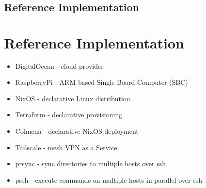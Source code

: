 \hypertarget{section}{%
\chapter{}\label{section}}

\section{Reference Implementation}

\hypertarget{reference-implementation}{%
\chapter{Reference Implementation}\label{reference-implementation}}

\begin{itemize}
\tightlist
\item
  DigitalOcean - cloud provider
\item
  RaspberryPi - ARM based Single Board Computer (SBC)
\item
  NixOS - declarative Linux distribution
\item
  Terraform - declarative provisioning
\item
  Colmena - declarative NixOS deployment
\item
  Tailscale - mesh VPN as a Service
\item
  prsync - sync directories to multiple hosts over ssh
\item
  pssh - execute commands on multiple hosts in parallel over ssh
\end{itemize}
